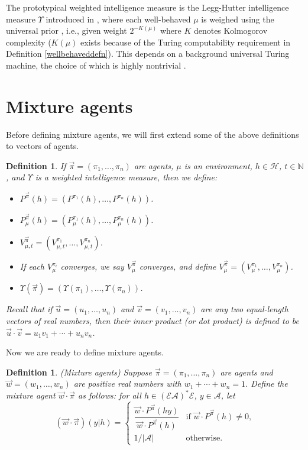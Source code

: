 \documentclass[twoside]{article}
\newtheorem{definition}[theorem]{Definition}
\begin{document}
The prototypical weighted intelligence measure is the Legg-Hutter intelligence
measure $\Upsilon$ introduced in \cite{legg2007universal},
where each well-behaved $\mu$ is
weighed using the universal prior \cite{li2008introduction}, i.e.,
given weight $2^{-K(\mu)}$
where $K$ denotes Kolmogorov complexity ($K(\mu)$ exists because of the Turing
computability requirement in Definition \ref{wellbehaveddefn}).
This depends on a background universal
Turing machine, the choice of which is highly nontrivial
\cite{leike2015bad}.

\section{Mixture agents}

Before defining mixture agents, we will first extend some of the above
definitions to vectors of agents.

\begin{definition}
    If $\vec\pi=(\pi_1,\ldots,\pi_n)$ are agents, $\mu$ is an environment,
    $h\in\mathcal H$, $t\in\mathbb N$, and $\Upsilon$ is a weighted
    intelligence measure, then we define:
    \begin{itemize}
        \item ${P^{\vec\pi}}(h)=(P^{\pi_1}(h),\ldots,P^{\pi_n}(h))$.
        \item $P^{\vec\pi}_\mu(h)=(P^{\pi_1}_\mu(h),\ldots,P^{\pi_n}_\mu(h))$.
        \item $V^{\vec\pi}_{\mu,t}=(V^{\pi_1}_{\mu,t},\ldots,V^{\pi_n}_{\mu,t})$.
        \item If each $V^{\pi_i}_\mu$ converges, we say $V^{\vec\pi}_\mu$
            converges, and define $V^{\vec\pi}_\mu=(V^{\pi_1}_\mu,\ldots,V^{\pi_n}_\mu)$.
        \item $\Upsilon(\vec\pi)=(\Upsilon(\pi_1),\ldots,\Upsilon(\pi_n))$.
    \end{itemize}
    Recall that if $\vec u=(u_1,\ldots,u_n)$ and
    $\vec v=(v_1,\ldots,v_n)$ are any two equal-length
    vectors of real numbers, then their \emph{inner product}
    (or \emph{dot product}) is defined to be
    $\vec u\cdot \vec v=u_1v_1+\cdots+u_nv_n$.
\end{definition}

Now we are ready to define mixture agents.

\begin{definition}
\label{maindefn}
    (Mixture agents)
    Suppose $\vec\pi=(\pi_1,\ldots,\pi_n)$ are agents and $\vec w=(w_1,\ldots,w_n)$
    are positive real numbers with $w_1+\cdots+w_n=1$.
    Define the \emph{mixture agent} $\vec w\cdot\vec\pi$ as follows: for all
    $h\in (\mathcal E\mathcal A)^*\mathcal E$, $y\in\mathcal A$, let
    \[
        (\vec w\cdot\vec\pi)(y|h)
        =
        \begin{cases}
            \dfrac{\vec w\cdot {P^{\vec\pi}}(hy)}{\vec w\cdot {P^{\vec\pi}}(h)}
            &\mbox{if $\vec w\cdot {P^{\vec\pi}}(h)\not=0$,}\\
            1/|\mathcal{A}| &\mbox{otherwise.}
        \end{cases}
    \]
\end{definition}
\end{document}

